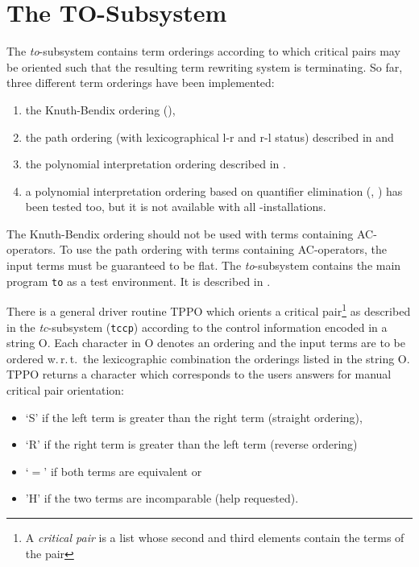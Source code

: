 \section{The TO-Subsystem} \label{se:to}

The {\it to}-subsystem contains term orderings according to which critical
pairs may be oriented such that the resulting term rewriting system is
terminating.
So far, three different term orderings have been implemented:
\begin{enumerate}
 \item the Knuth-Bendix ordering (\cite{KnuthBendix:67}),
 \item the path ordering (with lexicographical l-r and r-l status) described in
       \cite{KapurNarendranSivakumar:85} and
 \item  the polynomial interpretation ordering described in
       \cite{BenCherifaLescanne:87}.
 \item a polynomial interpretation ordering based on 
       quantifier elimination (\cite{Weispfenning:88},
       \cite{Loos:90}) has been tested too, but it is not available
       with all \redux-installations.

\end{enumerate}
The Knuth-Bendix ordering should not be used with terms containing AC-operators.
To use the path ordering with terms containing AC-operators, the input
terms must be guaranteed to be flat.
The {\it to}-subsystem contains the main program {\tt to} as a test environment.
It is described in \RUD.

There is a general driver routine TPPO which orients a critical pair\footnote{A
{\em critical pair} is a list whose second and third elements contain the 
terms of the pair} 
as described in the {\it tc}-subsystem ({\tt tccp}) according to
the control information encoded in a string O.
Each character in O denotes an ordering and the input terms are to be ordered 
w.\,r.\,t.\ the lexicographic combination the orderings listed in the string
O.
TPPO returns a character which corresponds to the users answers for
manual critical pair orientation:
\begin{itemize}
 \item `S' if the left term is greater than the right term (straight ordering),
 \item `R' if the right term is greater than the left term (reverse ordering)
 \item`$=$' if both terms are equivalent or
 \item 'H' if the two terms are incomparable (help requested).
\end{itemize}

